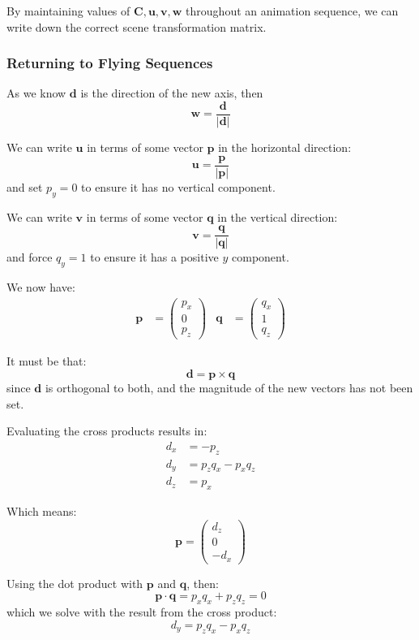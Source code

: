 \documentclass[11pt]{article}
\begin{document}
By maintaining values of $\bm{C}, \bm{u}, \bm{v}, \bm{w}$ throughout an animation sequence, we can write down the correct scene transformation matrix.

\subsubsection{Returning to Flying Sequences}
As we know $\bm{d}$ is the direction of the new axis, then
\[
  \bm{w} = \frac{\bm{d}}{\lvert \bm{d} \rvert}
\]

We can write $\bm{u}$ in terms of some vector $\bm{p}$ in the horizontal direction:
\[
  \bm{u} = \frac{\bm{p}}{\lvert \bm{p} \rvert}
\]
and set $p_y = 0$ to ensure it has no vertical component.

We can write $\bm{v}$ in terms of some vector $\bm{q}$ in the vertical direction:
\[
  \bm{v} = \frac{\bm{q}}{\lvert \bm{q} \rvert}
\]
and force $q_y = 1$ to ensure it has a positive $y$ component.

We now have:
\begin{align*}
  \bm{p} &= \begin{pmatrix} p_x \\ 0 \\ p_z \end{pmatrix}
  & \bm{q} &= \begin{pmatrix} q_x \\ 1 \\ q_z \end{pmatrix}
\end{align*}

It must be that:
\[
  \bm{d} = \bm{p} \times \bm{q} 
\]
since $\bm{d}$ is orthogonal to both, and the magnitude of the new vectors has not been set.

Evaluating the cross products results in:
\begin{align*}
  d_x &= -p_z \\
  d_y &= p_zq_x - p_xq_z \\
  d_z &= p_x
\end{align*}

Which means:
\[
  \bm{p} = \begin{pmatrix} d_z \\ 0 \\ -d_x \end{pmatrix} 
\]

Using the dot product with $\bm{p}$ and $\bm{q}$, then:
\[
  \bm{p} \cdot \bm{q} = p_xq_x + p_zq_z = 0
\]
which we solve with the result from the cross product:
\[
  d_y = p_zq_x - p_xq_z
\]
\end{document}
